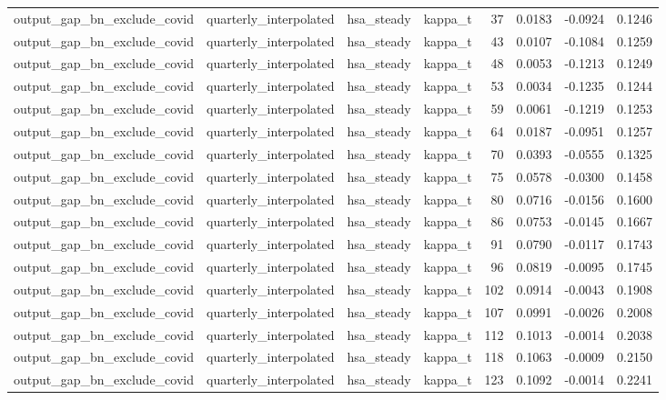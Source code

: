 \begin{tabular}{llllrrrr}
output\_gap\_bn\_exclude\_covid & quarterly\_interpolated & hsa\_steady & kappa\_t & 37 & 0.0183 & -0.0924 & 0.1246 \\
output\_gap\_bn\_exclude\_covid & quarterly\_interpolated & hsa\_steady & kappa\_t & 43 & 0.0107 & -0.1084 & 0.1259 \\
output\_gap\_bn\_exclude\_covid & quarterly\_interpolated & hsa\_steady & kappa\_t & 48 & 0.0053 & -0.1213 & 0.1249 \\
output\_gap\_bn\_exclude\_covid & quarterly\_interpolated & hsa\_steady & kappa\_t & 53 & 0.0034 & -0.1235 & 0.1244 \\
output\_gap\_bn\_exclude\_covid & quarterly\_interpolated & hsa\_steady & kappa\_t & 59 & 0.0061 & -0.1219 & 0.1253 \\
output\_gap\_bn\_exclude\_covid & quarterly\_interpolated & hsa\_steady & kappa\_t & 64 & 0.0187 & -0.0951 & 0.1257 \\
output\_gap\_bn\_exclude\_covid & quarterly\_interpolated & hsa\_steady & kappa\_t & 70 & 0.0393 & -0.0555 & 0.1325 \\
output\_gap\_bn\_exclude\_covid & quarterly\_interpolated & hsa\_steady & kappa\_t & 75 & 0.0578 & -0.0300 & 0.1458 \\
output\_gap\_bn\_exclude\_covid & quarterly\_interpolated & hsa\_steady & kappa\_t & 80 & 0.0716 & -0.0156 & 0.1600 \\
output\_gap\_bn\_exclude\_covid & quarterly\_interpolated & hsa\_steady & kappa\_t & 86 & 0.0753 & -0.0145 & 0.1667 \\
output\_gap\_bn\_exclude\_covid & quarterly\_interpolated & hsa\_steady & kappa\_t & 91 & 0.0790 & -0.0117 & 0.1743 \\
output\_gap\_bn\_exclude\_covid & quarterly\_interpolated & hsa\_steady & kappa\_t & 96 & 0.0819 & -0.0095 & 0.1745 \\
output\_gap\_bn\_exclude\_covid & quarterly\_interpolated & hsa\_steady & kappa\_t & 102 & 0.0914 & -0.0043 & 0.1908 \\
output\_gap\_bn\_exclude\_covid & quarterly\_interpolated & hsa\_steady & kappa\_t & 107 & 0.0991 & -0.0026 & 0.2008 \\
output\_gap\_bn\_exclude\_covid & quarterly\_interpolated & hsa\_steady & kappa\_t & 112 & 0.1013 & -0.0014 & 0.2038 \\
output\_gap\_bn\_exclude\_covid & quarterly\_interpolated & hsa\_steady & kappa\_t & 118 & 0.1063 & -0.0009 & 0.2150 \\
output\_gap\_bn\_exclude\_covid & quarterly\_interpolated & hsa\_steady & kappa\_t & 123 & 0.1092 & -0.0014 & 0.2241 \\

\end{tabular}
